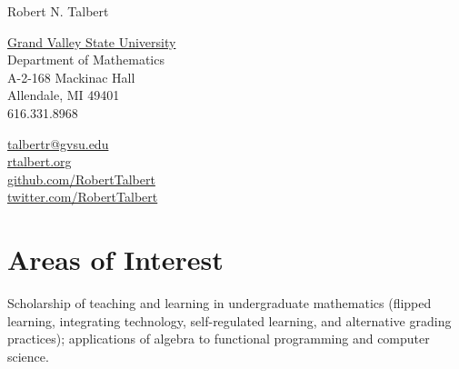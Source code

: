 \documentclass[letterpaper]{article}
\def\name{Robert N. Talbert}
\renewenvironment{itemize}{
  \begin{list}{}{
    \setlength{\leftmargin}{1.5em}
	\setlength{\itemsep}{0in}
  }
}{
  \end{list}
}
\begin{document}
{\Large \name}


\vspace{0.25in}

\begin{minipage}{0.45\linewidth}
  \href{http://www.gvsu.edu/}{Grand Valley State University} \\
  Department of Mathematics \\
  A-2-168 Mackinac Hall \\
  Allendale, MI 49401 \\
  616.331.8968
\end{minipage}
\begin{minipage}{0.45\linewidth}
    \href{mailto:talbertr@gvsu.edu}{talbertr@gvsu.edu} \\
    \href{http://rtalbert.org}{rtalbert.org} \\
    \href{http://www.github.com}{github.com/RobertTalbert} \\
    \href{http://www.twitter.com/RobertTalbert}{twitter.com/RobertTalbert} \\
\end{minipage}




\section*{Areas of Interest}

\begin{itemize}
  Scholarship of teaching and learning in undergraduate mathematics (flipped learning, integrating technology, self-regulated learning, and alternative grading practices); applications of algebra to functional programming and computer science.
\end{itemize}
\end{document}

